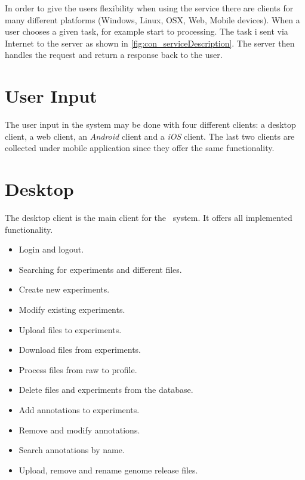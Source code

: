 \begin{comment}
\begin{figure}[h]
\addImage{genomizerDiagramServiceDescription.png}
\caption{Communication diagram of the product}
\label{fig:con_serviceDescription}
\end{figure}
\end{comment}
	
In order to give the users flexibility when using the service there are clients for many different platforms (Windows, Linux, OSX, Web, Mobile devices). 
When a user chooses a given task, for example start  to  processing. The task i sent via Internet to the server as shown in \ref{fig:con_serviceDescription}. The server then handles the request and return a response back to the user.

\section{User Input}
The user input in the \appName system may be done with four different clients: a desktop client, a web client, an \textit{Android} client and a \textit{iOS} client. The last two clients are collected under mobile application since they offer the same functionality.

\section{Desktop}
The desktop client is the main client for the \appName\ system. It offers all implemented functionality. 
\begin{itemize}
\item Login and logout.
\item Searching for experiments and different files.
\item Create new experiments.
\item Modify existing experiments.
\item Upload files to experiments.
\item Download files from experiments.
\item Process files from raw to profile.
\item Delete files and experiments from the database.
\item Add annotations to experiments.
\item Remove and modify annotations.
\item Search annotations by name.
\item Upload, remove and rename genome release files.
\end{itemize}

